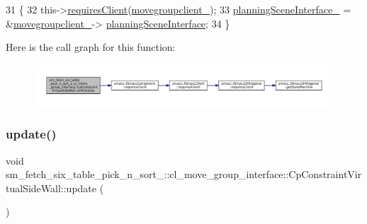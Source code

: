 \begin{DoxyCode}
31         \{
32             this->\hyperlink{classsmacc_1_1ISmaccComponent_a36c085d906fbae0fcaee817aaeafebf4}{requiresClient}(\hyperlink{classsm__fetch__six__table__pick__n__sort__1_1_1cl__move__group__interface_1_1CpConstraintVirtualSideWall_a5a22f10094eddc66ee4323097e3958f4}{movegroupclient\_});
33             \hyperlink{classsm__fetch__six__table__pick__n__sort__1_1_1cl__move__group__interface_1_1CpConstraintVirtualSideWall_a691e884fffbc5e310745d0ac1fc594b4}{planningSceneInterface\_} = &\hyperlink{classsm__fetch__six__table__pick__n__sort__1_1_1cl__move__group__interface_1_1CpConstraintVirtualSideWall_a5a22f10094eddc66ee4323097e3958f4}{movegroupclient\_}->
      \hyperlink{classcl__move__group__interface_1_1ClMoveGroup_a11bfab580f36e2ad32c9b37d6f58f44c}{planningSceneInterface};
34         \}
\end{DoxyCode}
Here is the call graph for this function\+:
\nopagebreak
\begin{figure}[H]
\begin{center}
\leavevmode
\includegraphics[width=350pt]{classsm__fetch__six__table__pick__n__sort__1_1_1cl__move__group__interface_1_1CpConstraintVirtualSideWall_a409f2624001978e120faa2f79d7e150e_cgraph}
\end{center}
\end{figure}
\mbox{\label{classsm__fetch__six__table__pick__n__sort__1_1_1cl__move__group__interface_1_1CpConstraintVirtualSideWall_a7631ce0dba22a59484ad96eb0f5482d5}} 
\subsubsection{\texorpdfstring{update()}{update()}}
{\footnotesize\ttfamily void sm\+\_\+fetch\+\_\+six\+\_\+table\+\_\+pick\+\_\+n\+\_\+sort\+\_\+::cl\+\_\+move\+\_\+group\+\_\+interface\+::\+Cp\+Constraint\+Virtual\+Side\+Wall\+::update (\begin{DoxyParamCaption}{ }\end{DoxyParamCaption})\hspace{0.3cm}{\ttfamily [virtual]}}




